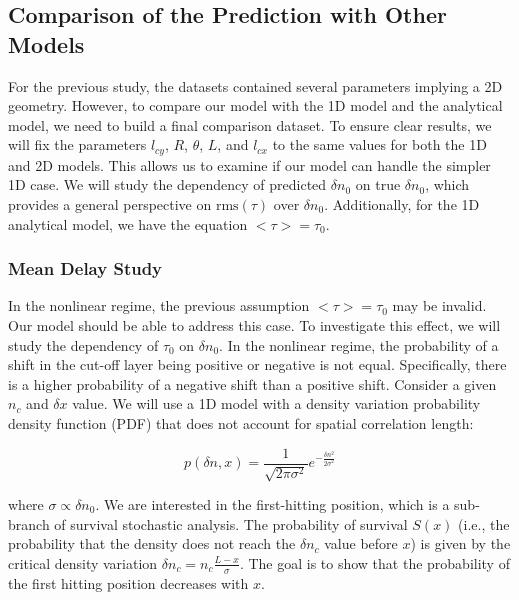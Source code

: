\documentclass[11pt,a4paper,openany]{report}
\begin{document}
\begin{multicols}{2}

    \subsection{Comparison of the Prediction with Other Models}

    For the previous study, the datasets contained several parameters implying a 2D geometry. However, to compare our model with the 1D model and the analytical model, we need to build a final comparison dataset. To ensure clear results, we will fix the parameters $l_{cy}$, $R$, $\theta$, $L$, and $l_{cx}$ to the same values for both the 1D and 2D models. This allows us to examine if our model can handle the simpler 1D case. We will study the dependency of predicted $\delta n_0$ on true $\delta n_0$, which provides a general perspective on $\text{rms}(\tau)$ over $\delta n_0$. Additionally, for the 1D analytical model, we have the equation $< \tau > = \tau_0$.

    \subsubsection{Mean Delay Study}

    In the nonlinear regime, the previous assumption $< \tau > = \tau_0$ may be invalid. Our model should be able to address this case. To investigate this effect, we will study the dependency of $\tau_0$ on $\delta n_0$. In the nonlinear regime, the probability of a shift in the cut-off layer being positive or negative is not equal. Specifically, there is a higher probability of a negative shift than a positive shift. Consider a given $n_c$ and $\delta x$ value. We will use a 1D model with a density variation probability density function (PDF) that does not account for spatial correlation length:

    $$
        p(\delta n, x) = \frac{1}{\sqrt{2 \pi \sigma^2}} e^{-\frac{\delta n^2}{2\sigma^2}}
    $$

    where $\sigma \propto \delta n_0$. We are interested in the first-hitting position, which is a sub-branch of survival stochastic analysis. The probability of survival $S(x)$ (i.e., the probability that the density does not reach the $\delta n_c$ value before $x$) is given by the critical density variation $\delta n_c = n_c \frac{L - x}{\sigma}$. The goal is to show that the probability of the first hitting position decreases with $x$.


\end{multicols}
\end{document}
